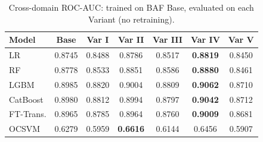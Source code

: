 \begin{table}[ht!]
\centering
\caption{Cross-domain ROC-AUC: trained on BAF Base, evaluated on each Variant (no retraining).}
\label{tab:crossdomain_rocauc}
\begin{tabular}{l c c c c c c}
\toprule
Model & Base & Var I & Var II & Var III & Var IV & Var V \\
\midrule
LR         & 0.8745 & 0.8488 & 0.8786 & 0.8517 & \textbf{0.8819} & 0.8450 \\
RF         & 0.8778 & 0.8533 & 0.8851 & 0.8586 & \textbf{0.8880} & 0.8461 \\
LGBM       & 0.8985 & 0.8820 & 0.9004 & 0.8809 & \textbf{0.9062} & 0.8710 \\
CatBoost   & 0.8980 & 0.8812 & 0.8994 & 0.8797 & \textbf{0.9042} & 0.8712 \\
FT-Trans.  & 0.8965 & 0.8785 & 0.8964 & 0.8760 & \textbf{0.9009} & 0.8681 \\
OCSVM      & 0.6279 & 0.5959 & \textbf{0.6616} & 0.6144 & 0.6456 & 0.5907 \\
\bottomrule
\end{tabular}
\end{table}